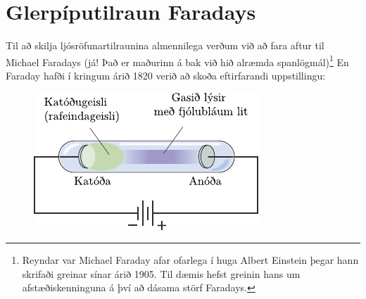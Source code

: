 \ifdefined \wholebook \else\documentclass[oneside]{book}\usepackage{EdlBook}\graphicspath{{figures/}}
\begin{document}
\section{Glerpíputilraun Faradays}

Til að skilja ljósröfunartilraunina almennilega verðum við að fara aftur til Michael Faradays (já! Það er maðurinn á bak við hið alræmda spanlögmál)\footnote{Reyndar var Michael Faraday afar ofarlega í huga Albert Einstein þegar hann skrifaði greinar sínar árið 1905. Til dæmis hefst greinin hans um afstæðiskenninguna á því að dásama störf Faradays.} En Faraday hafði í kringum árið 1820 verið að skoða eftirfarandi uppstillingu:

\begin{figure}[H]
    \centering
    \includegraphics{figures/faraday.pdf}
\end{figure}
\end{document}

